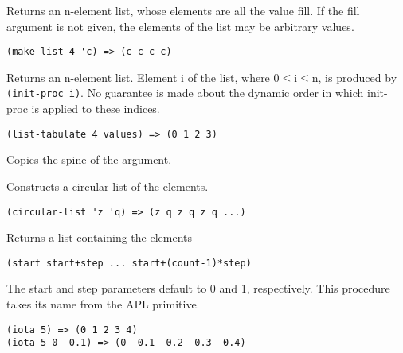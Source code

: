 \begin{entry}{%
  }
  
  Returns an n-element list, whose elements are all the value fill. If
  the fill argument is not given, the elements of the list may be
  arbitrary values.

\begin{verbatim}
(make-list 4 'c) => (c c c c)
\end{verbatim}
\end{entry}


\begin{entry}{%
  }
  
  Returns an n-element list. Element i of the list, where $0≤\textrm{i}≤\textrm{n}$,
    is produced by \texttt{(init-proc\
    i)}. No guarantee is made about the dynamic order in which
  init-proc is applied to these indices.

\begin{verbatim}
(list-tabulate 4 values) => (0 1 2 3)
\end{verbatim}

\end{entry}


\begin{entry}{%
  }

  Copies the
  spine of the argument.  
\end{entry}

\begin{entry}{%
  }
  
  Constructs a circular list of the
  elements.

\begin{verbatim}
(circular-list 'z 'q) => (z q z q z q ...)
\end{verbatim}
\end{entry}

\begin{entry}{%
  }

  Returns a list containing the elements

\begin{verbatim}
(start start+step ... start+(count-1)*step)
\end{verbatim}

  The start and step parameters default to 0 and 1, respectively. This
  procedure takes its name from the APL primitive.

\begin{verbatim}
(iota 5) => (0 1 2 3 4)
(iota 5 0 -0.1) => (0 -0.1 -0.2 -0.3 -0.4)
\end{verbatim}
\end{entry}

